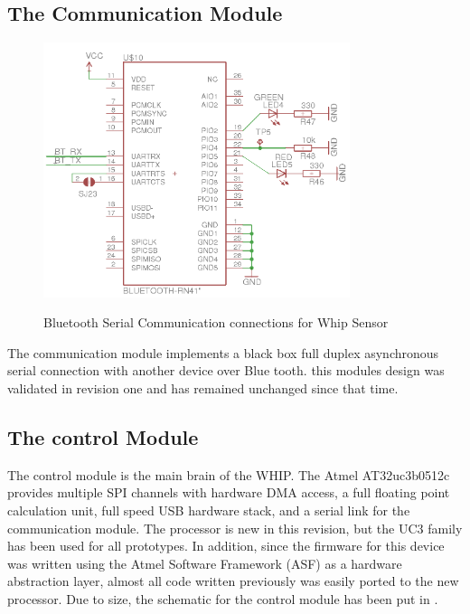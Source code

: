\subsection{The Communication Module}
\begin{figure}
	\begin{center}
		\label{fig:Rev5_BT}
		\includegraphics[scale=1,width=0.8\textwidth]{Images/Rev5_BT.png} 
		\caption{Bluetooth Serial Communication connections for Whip Sensor}
	\end{center}
\end{figure}
The communication module implements a black box full duplex asynchronous serial connection with another device over Blue tooth. this modules design was validated in revision one and has remained unchanged since that time. 

\subsection{The control Module}
The control module is the main brain of the WHIP. The Atmel AT32uc3b0512c provides multiple SPI channels with hardware DMA access, a full floating point calculation unit, full speed USB hardware stack, and a serial link for the communication module. The processor is new in this revision, but the UC3 family has been used for all prototypes. In addition, since the firmware for this device was written using the Atmel Software Framework (ASF) as a hardware abstraction layer, almost all code written previously was easily ported to the new processor. Due to size, the schematic for the control module has been put in .

